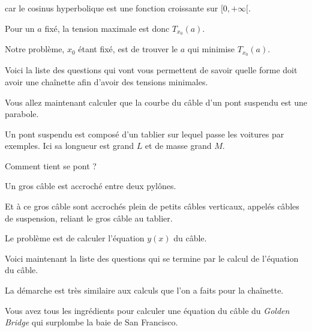 car le cosinus hyperbolique est une fonction croissante sur $[0,+\infty[$. 

\change
Pour un $a$
fixé, la tension maximale est donc $T_{x_0}(a)$. 

\change
Notre problème, $x_0$ étant fixé, est de trouver
le $a$ qui minimise $T_{x_0}(a)$.


\diapo

Voici la liste des questions qui vont vous permettent de savoir quelle
forme doit avoir une chaînette afin d'avoir des tensions minimales.



\diapo

\change
Vous allez maintenant calculer que la courbe du câble 
d'un pont suspendu est une parabole.

\change
Un pont suspendu est composé d'un tablier sur lequel passe les voitures par exemples.
Ici sa longueur est grand $L$ et de masse grand $M$.

\change
Comment tient se pont ?

Un gros câble est accroché entre deux pylônes. 

\change
Et à ce gros câble sont accrochés plein de petits câbles verticaux,
appelés câbles de suspension, reliant le gros câble au tablier.

Le problème est de calculer l'équation $y(x)$ du câble. 



\diapo

Voici maintenant la liste des questions qui se termine par 
le calcul de l'équation du câble.

La démarche est très similaire aux calculs que 
l'on a faits pour la chaînette.

\diapo

Vous avez tous les ingrédients pour calculer 
une équation du câble du \emph{Golden Bridge} qui surplombe
la baie de San Francisco.


